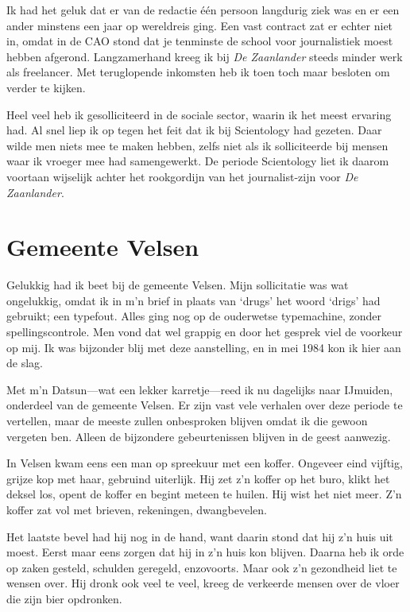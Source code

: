 \documentclass[12pt,twoside, openright]{memoir}
\begin{document}
Ik had het geluk dat er van de redactie één persoon langdurig ziek was en er een ander minstens een jaar op wereldreis ging. Een vast contract zat er echter niet in, omdat in de CAO stond dat je tenminste de school voor journalistiek moest hebben afgerond. Langzamerhand kreeg ik bij \emph{De Zaanlander} steeds minder werk als freelancer. Met teruglopende inkomsten heb ik toen toch maar besloten om verder te kijken.

Heel veel heb ik gesolliciteerd in de sociale sector, waarin ik het meest ervaring had. Al snel liep ik op tegen het feit dat ik bij Scientology had gezeten. Daar wilde men niets mee te maken hebben, zelfs niet als ik solliciteerde bij mensen waar ik vroeger mee had samengewerkt. De periode Scientology liet ik daarom voortaan wijselijk achter het rookgordijn van het journalist-zijn voor \emph{De Zaanlander}.

\section*{Gemeente Velsen} %
\label{cha:velsen}

Gelukkig had ik beet bij de gemeente Velsen. Mijn sollicitatie was wat ongelukkig, omdat ik in  m’n brief in plaats van `drugs' het woord `drigs' had gebruikt; een typefout. Alles ging nog op de ouderwetse typemachine, zonder spellingscontrole. Men vond dat wel grappig en door het gesprek viel de voorkeur op mij. Ik was bijzonder blij met deze aanstelling, en in mei 1984 kon ik hier aan de slag.

Met m’n Datsun---wat een lekker karretje---reed ik nu dagelijks naar IJmuiden, onderdeel van de gemeente Velsen. Er zijn vast vele verhalen over deze periode te vertellen, maar de meeste zullen onbesproken blijven omdat ik die gewoon vergeten ben. Alleen de bijzondere gebeurtenissen blijven in de geest aanwezig.

In Velsen kwam eens een man op spreekuur met een koffer. Ongeveer eind vijftig, grijze kop met haar, gebruind uiterlijk. Hij zet z’n koffer op het buro, klikt het deksel los, opent de koffer en begint meteen te huilen. Hij wist het niet meer. Z’n koffer zat vol met brieven, rekeningen, dwangbevelen. 

Het laatste bevel had hij nog in de hand, want daarin stond dat hij z’n huis uit moest. Eerst maar eens zorgen dat hij in z’n huis kon blijven. Daarna heb ik orde op zaken gesteld, schulden geregeld, enzovoorts. Maar ook z’n gezondheid liet te wensen over. Hij dronk ook veel te veel, kreeg de verkeerde mensen over de vloer die zijn bier opdronken. 
\end{document}
